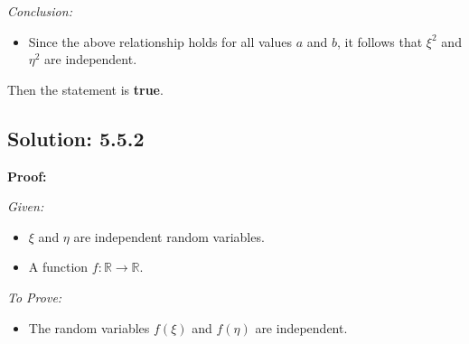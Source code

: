 \textit{Conclusion:}
\begin{itemize}
    \item Since the above relationship holds for all values \( a \) and \( b \), it follows that \(\xi^2\) and \(\eta^2\) are independent.
\end{itemize}

Then the statement is \textbf{true}.

\subsection*{Solution: 5.5.2}

\textbf{Proof:}

\textit{Given:}
\begin{itemize}
    \item \(\xi\) and \(\eta\) are independent random variables.
    \item A function \(f : \mathbb{R} \rightarrow \mathbb{R}\).
\end{itemize}

\textit{To Prove:}
\begin{itemize}
    \item The random variables \(f(\xi)\) and \(f(\eta)\) are independent.
\end{itemize}

